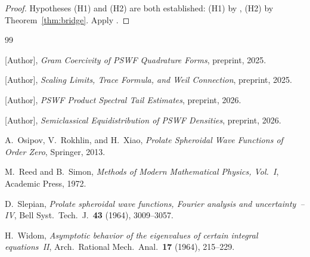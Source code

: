 \documentclass[12pt,a4paper]{article}
\theoremstyle{definition}
\begin{document}
\begin{proof}
Hypotheses (H1) and (H2) are both established:
(H1) by \cite{PaperIV},
(H2) by Theorem~\ref{thm:bridge}.
Apply \cite[Theorem~3.2]{PaperIII}.
\end{proof}

\begin{thebibliography}{99}

[Author], \textit{Gram Coercivity of PSWF Quadrature
Forms}, preprint, 2025.

[Author], \textit{Scaling Limits, Trace Formula, and
Weil Connection}, preprint, 2025.

[Author], \textit{PSWF Product Spectral Tail Estimates},
preprint, 2026.

[Author], \textit{Semiclassical Equidistribution of PSWF
Densities}, preprint, 2026.

A.~Osipov, V.~Rokhlin, and H.~Xiao,
\textit{Prolate Spheroidal Wave Functions of Order Zero},
Springer, 2013.

M.~Reed and B.~Simon,
\textit{Methods of Modern Mathematical Physics, Vol.~I},
Academic Press, 1972.

D.~Slepian,
\textit{Prolate spheroidal wave functions, Fourier
analysis and uncertainty~-- IV},
Bell Syst.\ Tech.\ J.\ \textbf{43} (1964), 3009--3057.

H.~Widom,
\textit{Asymptotic behavior of the eigenvalues of certain
integral equations~II},
Arch.\ Rational Mech.\ Anal.\ \textbf{17} (1964),
215--229.

\end{thebibliography}
\end{document}
